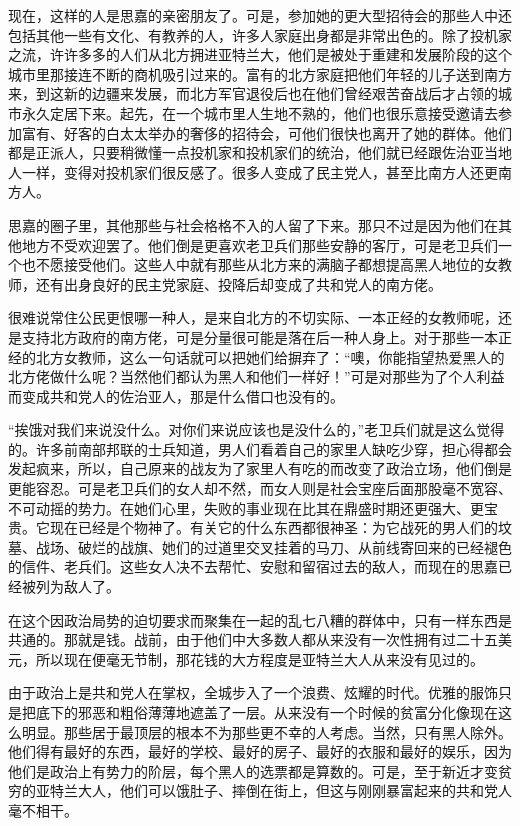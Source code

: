 \par 现在，这样的人是思嘉的亲密朋友了。可是，参加她的更大型招待会的那些人中还包括其他一些有文化、有教养的人，许多人家庭出身都是非常出色的。除了投机家之流，许许多多的人们从北方拥进亚特兰大，他们是被处于重建和发展阶段的这个城市里那接连不断的商机吸引过来的。富有的北方家庭把他们年轻的儿子送到南方来，到这新的边疆来发展，而北方军官退役后也在他们曾经艰苦奋战后才占领的城市永久定居下来。起先，在一个城市里人生地不熟的，他们也很乐意接受邀请去参加富有、好客的白太太举办的奢侈的招待会，可他们很快也离开了她的群体。他们都是正派人，只要稍微懂一点投机家和投机家们的统治，他们就已经跟佐治亚当地人一样，变得对投机家们很反感了。很多人变成了民主党人，甚至比南方人还更南方人。
\par 思嘉的圈子里，其他那些与社会格格不入的人留了下来。那只不过是因为他们在其他地方不受欢迎罢了。他们倒是更喜欢老卫兵们那些安静的客厅，可是老卫兵们一个也不愿接受他们。这些人中就有那些从北方来的满脑子都想提高黑人地位的女教师，还有出身良好的民主党家庭、投降后却变成了共和党人的南方佬。
\par 很难说常住公民更恨哪一种人，是来自北方的不切实际、一本正经的女教师呢，还是支持北方政府的南方佬，可是分量很可能是落在后一种人身上。对于那些一本正经的北方女教师，这么一句话就可以把她们给摒弃了：“噢，你能指望热爱黑人的北方佬做什么呢？当然他们都认为黑人和他们一样好！”可是对那些为了个人利益而变成共和党人的佐治亚人，那是什么借口也没有的。
\par “挨饿对我们来说没什么。对你们来说应该也是没什么的，”老卫兵们就是这么觉得的。许多前南部邦联的士兵知道，男人们看着自己的家里人缺吃少穿，担心得都会发起疯来，所以，自己原来的战友为了家里人有吃的而改变了政治立场，他们倒是更能容忍。可是老卫兵们的女人却不然，而女人则是社会宝座后面那股毫不宽容、不可动摇的势力。在她们心里，失败的事业现在比其在鼎盛时期还更强大、更宝贵。它现在已经是个物神了。有关它的什么东西都很神圣：为它战死的男人们的坟墓、战场、破烂的战旗、她们的过道里交叉挂着的马刀、从前线寄回来的已经褪色的信件、老兵们。这些女人决不去帮忙、安慰和留宿过去的敌人，而现在的思嘉已经被列为敌人了。
\par 在这个因政治局势的迫切要求而聚集在一起的乱七八糟的群体中，只有一样东西是共通的。那就是钱。战前，由于他们中大多数人都从来没有一次性拥有过二十五美元，所以现在便毫无节制，那花钱的大方程度是亚特兰大人从来没有见过的。
\par 由于政治上是共和党人在掌权，全城步入了一个浪费、炫耀的时代。优雅的服饰只是把底下的邪恶和粗俗薄薄地遮盖了一层。从来没有一个时候的贫富分化像现在这么明显。那些居于最顶层的根本不为那些更不幸的人考虑。当然，只有黑人除外。他们得有最好的东西，最好的学校、最好的房子、最好的衣服和最好的娱乐，因为他们是政治上有势力的阶层，每个黑人的选票都是算数的。可是，至于新近才变贫穷的亚特兰大人，他们可以饿肚子、摔倒在街上，但这与刚刚暴富起来的共和党人毫不相干。
